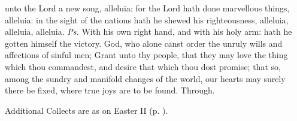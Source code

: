 
\properantiphonfix

\introit
{} unto the Lord a new song, alleluia: for the Lord hath done marvellous things, alleluia: in the sight of the nations hath he shewed his righteousness, alleluia, alleluia, alleluia. \textit{Ps.} With his own right hand, and with his holy arm: hath he gotten himself the victory.
\collect
{} God, who alone canst order the unruly wills and affections of sinful men; Grant unto thy people, that they may love the thing which thou commandest, and desire that which thou dost promise; that so, among the sundry and manifold changes of the world, our hearts may surely there be fixed, where true joys are to be found. Through.
\begin{rubric}
    Additional Collects are as on Easter II (p. \pageref{EasterIICollect}).
\end{rubric}

